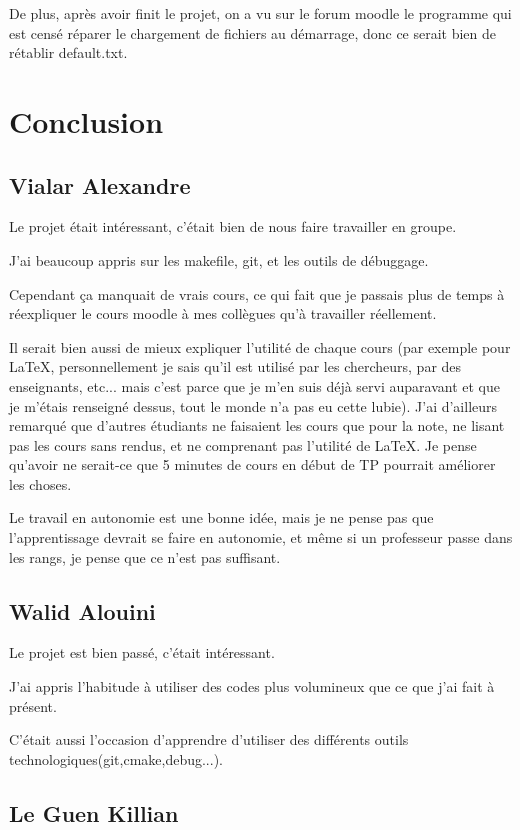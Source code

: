 \documentclass[12pt]{article}
\begin{document}
De plus, après avoir finit le projet, on a vu sur le forum moodle le programme qui est censé réparer le chargement de fichiers au démarrage, donc ce serait bien de rétablir default.txt.



\section{Conclusion}
\subsection{Vialar Alexandre}
Le projet était intéressant, c'était bien de nous faire travailler en groupe.

J'ai beaucoup appris sur les makefile, git, et les outils de débuggage.

Cependant ça manquait de vrais cours, ce qui fait que je passais plus de temps à réexpliquer le cours moodle à mes collègues qu'à travailler réellement.

Il serait bien aussi de mieux expliquer l'utilité de chaque cours (par exemple pour \LaTeX, personnellement je sais qu'il est utilisé par les chercheurs, par des enseignants, etc... mais c'est parce que je m'en suis déjà servi auparavant et que je m'étais renseigné dessus, tout le monde n'a pas eu cette lubie). 
J'ai d'ailleurs remarqué que d'autres étudiants ne faisaient les cours que pour la note, ne lisant pas les cours sans rendus, et ne comprenant pas l'utilité de \LaTeX.
Je pense qu'avoir ne serait-ce que 5 minutes de cours en début de TP pourrait améliorer les choses.

Le travail en autonomie est une bonne idée, mais je ne pense pas que l'apprentissage devrait se faire en autonomie, et même si un professeur passe dans les rangs, je pense que ce n'est pas suffisant.
\subsection{Walid Alouini}
Le projet est bien passé, c'était intéressant.

J'ai appris l'habitude à utiliser des codes plus volumineux que ce que j'ai fait à présent.

C'était aussi l'occasion d'apprendre d'utiliser des différents outils technologiques(git,cmake,debug...).
\subsection{Le Guen Killian}
\end{document}
